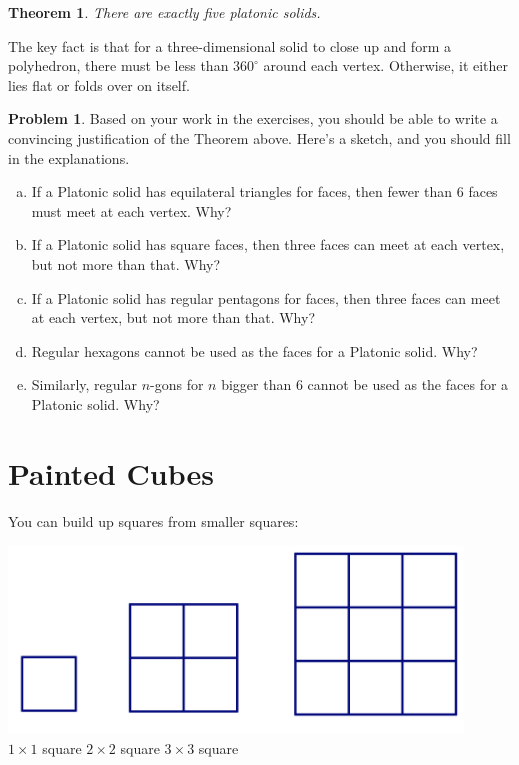 \documentclass[12pt, reqno]{amsart}
\newtheorem*{thm*}{Theorem}
\theoremstyle{remark}
\theoremstyle{definition}
\newtheorem{problem}{Problem}
\numberwithin{equation}{section}  %
\begin{document}
\begin{thm*}
There are exactly five platonic solids.
\end{thm*}
The key fact is that for a three-dimensional solid to close up and form a polyhedron, there must be less than $360^\circ$ around each vertex.  Otherwise, it either lies flat or folds over on itself.

\bigskip

\begin{problem}
Based on your work in the exercises, you should be able to write a convincing justification of the Theorem above.  Here's a sketch, and you should fill in the explanations.  

\begin{enumerate}[(a)]
\item
If a Platonic solid has equilateral triangles for faces, then fewer than 6 faces must meet at each vertex.  Why?\\

\item
If a Platonic solid has square faces, then three faces can meet at each vertex, but not more than that.  Why?\\

\item
If a Platonic solid has regular pentagons for faces, then three faces can meet at each vertex, but not more than that.  Why?\\

\item
Regular hexagons cannot be used as the faces for a Platonic solid.  Why?\\

\item
Similarly, regular $n$-gons for $n$ bigger than 6 cannot be used as the faces for a Platonic solid.  Why?\\

\end{enumerate}

\end{problem}



\newpage

\section{Painted Cubes}

You can build up squares from smaller squares:
\begin{center}
\includegraphics[height=5cm]{smallersqs}\\
$1\times1$ square
\qquad\quad
$2\times2$ square
\qquad\qquad\qquad\quad
$3\times3$ square
\qquad\qquad\qquad
\end{center}
\end{document}
